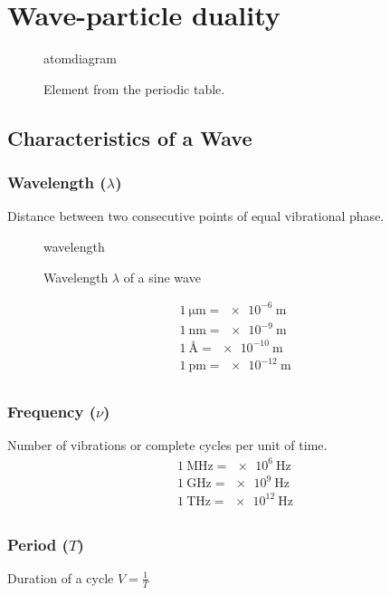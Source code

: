 \documentclass[10pt]{article}
\begin{document}
\section{Wave-particle duality}
\begin{figure}
	{atomdiagram}
	\caption{Element from the periodic table.}\label{fig:periodicelement}
\end{figure}

\subsection{Characteristics of a Wave}

\subsubsection*{Wavelength ($\lambda$)}
Distance between two consecutive points of equal vibrational phase.

\begin{figure}[H]
	\centering
	{wavelength}
	\caption{Wavelength $\lambda$ of a sine wave}\label{fig:wavelength}
\end{figure}
\begin{align*}
	\SI{1}{\micro\metre} = \SI{e-6}{\metre} \\[0.5em]
	\SI{1}{\nano\metre} = \SI{e-9}{\metre}  \\[0.5em]
	\SI{1}{\angstrom} = \SI{e-10}{\metre}   \\[0.5em]
	\SI{1}{\pico\metre} = \SI{e-12}{\metre} \\[0.5em]
\end{align*}

\subsubsection*{Frequency ($\nu$)}
Number of vibrations or complete cycles per unit of time.
\begin{align*}
	\SI{1}{\mega\hertz} = \SI{e6}{\hertz}  \\[0.5em]
	\SI{1}{\giga\hertz} = \SI{e9}{\hertz}  \\[0.5em]
	\SI{1}{\tera\hertz} = \SI{e12}{\hertz} \\[0.5em]
\end{align*}

\subsubsection*{Period ($T$)}
Duration of a cycle $V=\frac{1}{T}$
\end{document}
